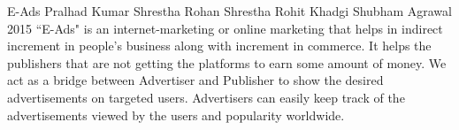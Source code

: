  \begin{conf-abstract}[]
{E-Ads}
{
Pralhad Kumar Shrestha
Rohan Shrestha
Rohit Khadgi
Shubham Agrawal
}
{2015}
``E-Ads" is an internet-marketing or online marketing that helps in indirect increment in people's business along with increment in commerce. It helps the publishers that are not getting the platforms to earn some amount of money. We act as a bridge between Advertiser and Publisher to show the desired advertisements on targeted users. Advertisers can easily keep track of the advertisements viewed by the users and popularity worldwide.
  \end{conf-abstract}